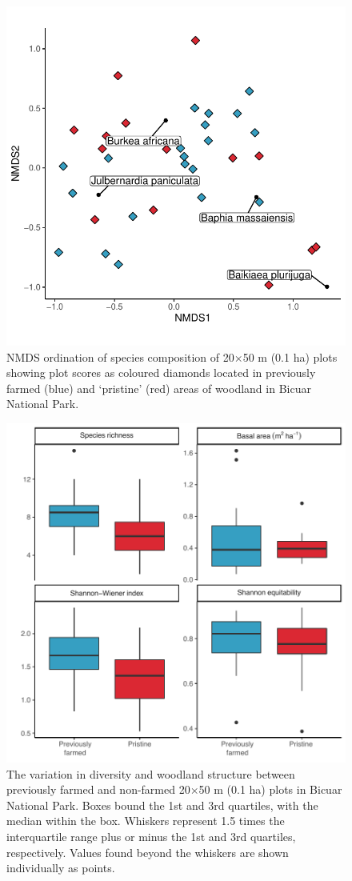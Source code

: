 \begin{refsection}
\begin{figure}
	\includegraphics[width=0.8\linewidth]{img/bicuar_degrad_nmds}
	\caption[NMDS ordination of non-farmed and previously farmed plots in Bicuar National Park]{NMDS ordination of species composition of 20$\times$50 m (0.1 ha) plots showing plot scores as coloured diamonds located in previously farmed (blue) and `pristine' (red) areas of woodland in Bicuar National Park.}
	\label{bicuar:bicuar_degrad_nmds}
\end{figure}

\begin{figure}
	\includegraphics[width=0.8\linewidth]{img/degrad_box}
	\caption[Variation in diversity and woodland structure among `pristine' and previously farmed plots]{The variation in diversity and woodland structure between previously farmed and non-farmed 20$\times$50 m (0.1 ha) plots in Bicuar National Park. Boxes bound the 1st and 3rd quartiles, with the median within the box. Whiskers represent 1.5 times the interquartile range plus or minus the 1st and 3rd quartiles, respectively. Values found beyond the whiskers are shown individually as points.}
	\label{bicuar:degrad_box}
\end{figure}


\end{refsection}
